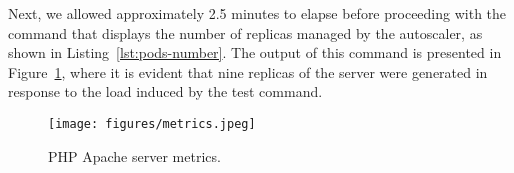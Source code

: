 Next, we allowed approximately 2.5 minutes to elapse before proceeding with the command that displays the number of replicas managed by the autoscaler, as shown in Listing~\ref{lst:pods-number}. The output of this command is presented in Figure~\ref{fig:metrics}, where it is evident that nine replicas of the server were generated in response to the load induced by the test command.

\begin{figure}[!htbp]
  \centering
  \texttt{[image: figures/metrics.jpeg]}
  \caption{PHP Apache server metrics.}
  \label{fig:metrics}
\end{figure}
